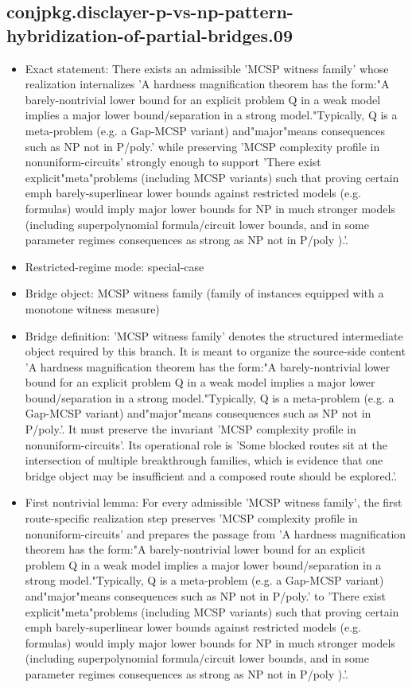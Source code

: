 \documentclass[11pt]{article}
\begin{document}
\subsection*{conjpkg.disclayer-p-vs-np-pattern-hybridization-of-partial-bridges.09}
\begin{itemize}
\item Exact statement: There exists an admissible 'MCSP witness family' whose realization internalizes 'A hardness magnification theorem has the form:"A barely-nontrivial lower bound for an explicit problem Q in a weak model implies a major lower bound/separation in a strong model."Typically, Q is a meta-problem (e.g. a Gap-MCSP variant) and"major"means consequences such as NP not in P/poly.' while preserving 'MCSP complexity profile in nonuniform-circuits' strongly enough to support 'There exist explicit"meta"problems (including MCSP variants) such that proving certain emph barely-superlinear lower bounds against restricted models (e.g. formulas) would imply major lower bounds for NP in much stronger models (including superpolynomial formula/circuit lower bounds, and in some parameter regimes consequences as strong as NP not in P/poly ).'.
\item Restricted-regime mode: special-case
\item Bridge object: MCSP witness family (family of instances equipped with a monotone witness measure)
\item Bridge definition: 'MCSP witness family' denotes the structured intermediate object required by this branch. It is meant to organize the source-side content 'A hardness magnification theorem has the form:"A barely-nontrivial lower bound for an explicit problem Q in a weak model implies a major lower bound/separation in a strong model."Typically, Q is a meta-problem (e.g. a Gap-MCSP variant) and"major"means consequences such as NP not in P/poly.'. It must preserve the invariant 'MCSP complexity profile in nonuniform-circuits'. Its operational role is 'Some blocked routes sit at the intersection of multiple breakthrough families, which is evidence that one bridge object may be insufficient and a composed route should be explored.'.
\item First nontrivial lemma: For every admissible 'MCSP witness family', the first route-specific realization step preserves 'MCSP complexity profile in nonuniform-circuits' and prepares the passage from 'A hardness magnification theorem has the form:"A barely-nontrivial lower bound for an explicit problem Q in a weak model implies a major lower bound/separation in a strong model."Typically, Q is a meta-problem (e.g. a Gap-MCSP variant) and"major"means consequences such as NP not in P/poly.' to 'There exist explicit"meta"problems (including MCSP variants) such that proving certain emph barely-superlinear lower bounds against restricted models (e.g. formulas) would imply major lower bounds for NP in much stronger models (including superpolynomial formula/circuit lower bounds, and in some parameter regimes consequences as strong as NP not in P/poly ).'.

\end{itemize}
\end{document}
